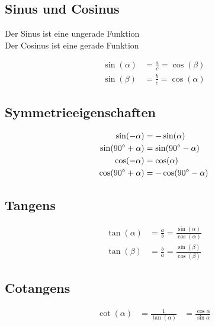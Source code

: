 


	\subsection{Sinus und Cosinus}
		Der Sinus ist eine ungerade Funktion \\
		Der Cosinus ist eine gerade Funktion
		\begin{emphbox}
			\begin{align*}
				\sin(\alpha) &= \frac{a}{c} = \cos(\beta) \\
				\sin(\beta) &= \frac{b}{c} = \cos(\alpha)
			\end{align*}
		\end{emphbox}

	\subsection{Symmetrieeigenschaften}
		\begin{emphbox}
			\begin{align*}
			\sin (-\alpha) &= -\sin(\alpha) \\
			\sin (90 \degree + \alpha) &= \sin (90 \degree - \alpha) \\
			\cos (-\alpha) &= \cos(\alpha)\\
			\cos (90 \degree + \alpha) &= -\cos (90 \degree - \alpha)
			\end{align*}
		\end{emphbox}


	\subsection{Tangens}
		\begin{emphbox}
			\begin{align*}
			\tan(\alpha) &= \frac{a}{b} = \frac{\sin(\alpha)}{\cos(\alpha)} \\
			\tan(\beta) &= \frac{b}{a} = \frac{\sin(\beta)}{\cos(\beta)}
			\end{align*}
		\end{emphbox}
		
	\subsection{Cotangens}
		\begin{emphbox}
			\begin{align*}
			\cot(\alpha) &= \frac{1}{\tan(\alpha)} &= \frac{\cos \alpha}{\sin \alpha} 		
			\end{align*}
		\end{emphbox}

